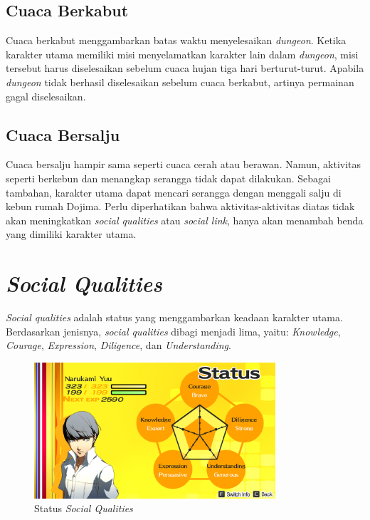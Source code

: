 \subsection{Cuaca Berkabut}
Cuaca berkabut menggambarkan batas waktu menyelesaikan \textit{dungeon}. Ketika karakter utama memiliki misi menyelamatkan karakter lain dalam \textit{dungeon}, misi tersebut harus diselesaikan sebelum cuaca hujan tiga hari berturut-turut. Apabila \textit{dungeon} tidak berhasil diselesaikan sebelum cuaca berkabut, artinya permainan gagal diselesaikan.

\subsection{Cuaca Bersalju}
Cuaca bersalju hampir sama seperti cuaca cerah atau berawan. Namun, aktivitas seperti berkebun dan menangkap serangga tidak dapat dilakukan. Sebagai tambahan, karakter utama dapat mencari serangga dengan menggali salju di kebun rumah Dojima. Perlu diperhatikan bahwa aktivitas-aktivitas diatas tidak akan meningkatkan \textit{social qualities} atau \textit{social link}, hanya akan menambah benda yang dimiliki karakter utama.


\section{\label{socialqualities}\textit{Social Qualities}}
\textit{Social qualities} adalah status yang menggambarkan keadaan karakter utama. Berdasarkan jenisnya, \textit{social qualities} dibagi menjadi lima, yaitu: \textit{Knowledge}, \textit{Courage}, \textit{Expression}, \textit{Diligence}, dan \textit{Understanding}.


\begin{figure}[htbp]
    \centering
    \includegraphics[width=0.8\textwidth]{resources/Dokumentasi/Screenshot (460).png}
    \caption{\label{socialstats}Status \textit{Social Qualities}}
\end{figure}

